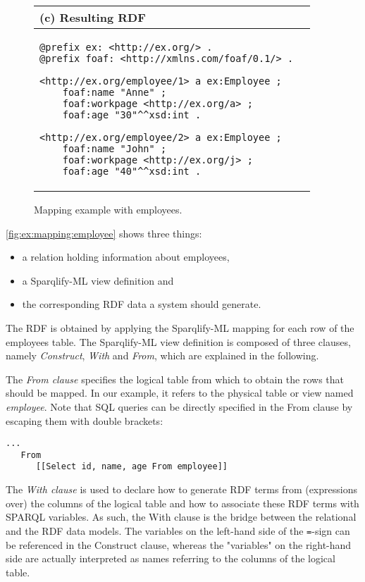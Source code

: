 \documentclass[a4paper,twoside,bibtotoc,abstracton,12pt,BCOR=15mm]{scrreprt}
\begin{document}
\begin{figure}[!p]
\begin{tabular}{p{6.5cm}p{8.5cm}}
\\

\multicolumn{2}{l}{(c) Resulting RDF} \\ \midrule
\begin{minipage}{\textwidth}
\begin{lstlisting}
@prefix ex: <http://ex.org/> .
@prefix foaf: <http://xmlns.com/foaf/0.1/> .

<http://ex.org/employee/1> a ex:Employee ;
    foaf:name "Anne" ;
    foaf:workpage <http://ex.org/a> ;
    foaf:age "30"^^xsd:int .

<http://ex.org/employee/2> a ex:Employee ;
    foaf:name "John" ;
    foaf:workpage <http://ex.org/j> ;
    foaf:age "40"^^xsd:int .

\end{lstlisting}
\end{minipage}


\\
\bottomrule
\end{tabular}
\caption{Mapping example with employees.}
\label{fig:ex:mapping:employee}
\end{figure}
\autoref{fig:ex:mapping:employee} shows three things:
\begin{itemize} 
\item a relation holding information about employees,
\item a Sparqlify-ML view definition and 
\item the corresponding RDF data a system should generate.
\end{itemize}
The RDF is obtained by applying the Sparqlify-ML mapping for each row of the employees table.
The Sparqlify-ML view definition is composed of three clauses, namely \emph{Construct}, \emph{With} and \emph{From},
which are explained in the following.

The \emph{From clause} specifies the logical table from which to obtain the rows that should be mapped.
In our example, it refers to the physical table or view named \emph{employee}.
Note that SQL queries can be directly
specified in the From clause by escaping them with double brackets:
\begin{lstlisting}
...
   From
      [[Select id, name, age From employee]]
\end{lstlisting}

The \emph{With clause} is used to declare how to generate RDF terms from (expressions over) the columns of the logical table and
how to associate these RDF terms with SPARQL variables.
As such, the With clause is the bridge between the relational and the RDF data models.
The variables on the left-hand side of the \texttt{=}-sign can be referenced in the Construct clause, whereas
the "variables" on the right-hand side are actually interpreted as names referring to the columns of the logical table.
\end{document}
